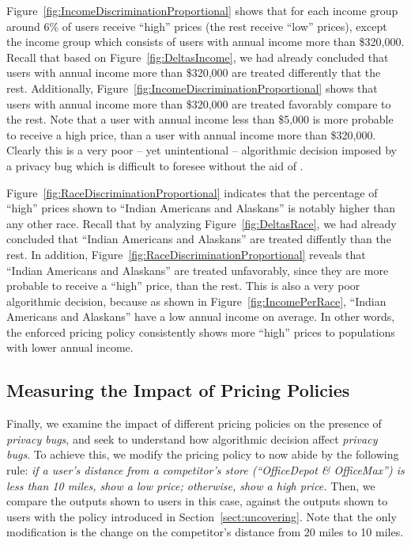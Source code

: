 Figure~\ref{fig:IncomeDiscriminationProportional} shows that for each income
group around 6\% of users receive ``high'' prices (the rest receive ``low''
prices), except the income group which consists of users with annual income
more than \$320,000. Recall that based on Figure~\ref{fig:DeltasIncome}, we
had already concluded that users with annual income more than \$320,000 are
treated differently that the rest. Additionally,
Figure~\ref{fig:IncomeDiscriminationProportional} shows that users with
annual income more than \$320,000 are treated favorably compare to the rest.
Note that a user with annual income less than \$5,000 is more probable to
receive a high price, than a user with annual income more than \$320,000.
Clearly this is a very poor -- yet unintentional -- algorithmic decision imposed
by a privacy bug which is difficult to foresee without the aid of \sysname.


Figure~\ref{fig:RaceDiscriminationProportional} indicates that the
percentage of ``high'' prices shown to ``Indian Americans and Alaskans'' is
notably higher than any other race. Recall that by analyzing
Figure~\ref{fig:DeltasRace}, we had already concluded that
``Indian Americans and Alaskans'' are treated diffently than the rest.
In addition, Figure~\ref{fig:RaceDiscriminationProportional} reveals that
``Indian Americans and Alaskans'' are treated unfavorably, since they are
more probable to receive a ``high'' price, than the rest. This is also a very
poor algorithmic decision, because as shown in Figure~\ref{fig:IncomePerRace},
``Indian Americans and Alaskans'' have a low annual income on average. In
other words, the enforced pricing policy consistently shows more
``high'' prices to populations with lower annual income.


\subsection{\normalsize Measuring the Impact of Pricing Policies}
Finally, we examine the impact of different pricing policies on the presence
of {\em privacy bugs}, and seek to understand how algorithmic decision
affect {\em privacy bugs}. To achieve this, we modify the pricing policy
to now abide by the following rule: {\it if a user's distance from a
competitor's store (``OfficeDepot \& OfficeMax'') is less than 10 miles,
show a low price; otherwise, show a high price.} Then, we compare the outputs
shown to users in this case, against the outputs shown to users with the policy
introduced in Section~\ref{sect:uncovering}. Note that the only modification 
is the change on the competitor's distance from 20 miles to 10 miles.

